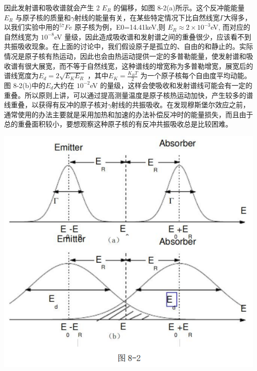 \documentclass[hyperref]{ctexart}
\begin{document}
\begin{multicols}{2}
	因此发射谱和吸收谱就会产生 2 $E_R$ 的偏移，如图 8-2(a)所示。这个反冲能能量 $E_R$ 与原子核的质量和$\gamma$射线的能量有关，在某些特定情况下比自然线宽$\Gamma$大得多，以我们实验中用的$^{57}Fe$ 原子核为例，E0=14.41keV,则 $E_R\approx2\times{10}^{-3}$eV, 而对应的自然线宽为 ${10}^{-8}$eV 量级，因此造成吸收谱和发射谱之间的重叠很少，应该看不到共振吸收现象。在上面的讨论中，我们假设原子是孤立的、自由的和静止的。实际情况是原子核有热运动，因此也会由热运动提供一定的多普勒能量，使发射谱和吸收谱有很大展宽，而不等于自然线宽，这种谱线的增宽称为多普勒增宽，展宽后的谱线宽度为$E_d=2\sqrt{E_K E_R}$ ，其中$E_K=\frac{K_BT}{2}$ 为一个原子核每个自由度平均动能。图 8-2(b)中的$E_d$大约在 ${10}^{-2}$eV 的量级，这样会使吸收和发射谱线可能会有一定的重叠。所以原则上讲，可以通过提高测量温度是原子核热运动加快，产生较多的谱线重叠，以获得有反冲的原子核对$\gamma$射线的共振吸收。在发现穆斯堡尔效应之前，通常使用的办法主要就是采用加热和加速的办法补偿反冲时的能量损失，而且由于总的重叠面积较小，要想观察这种原子核的有反冲共振吸收总是比较困难。

	\begin{center}\includegraphics[scale=0.3]{t82.png}\end{center}

\end{multicols}
\end{document}
